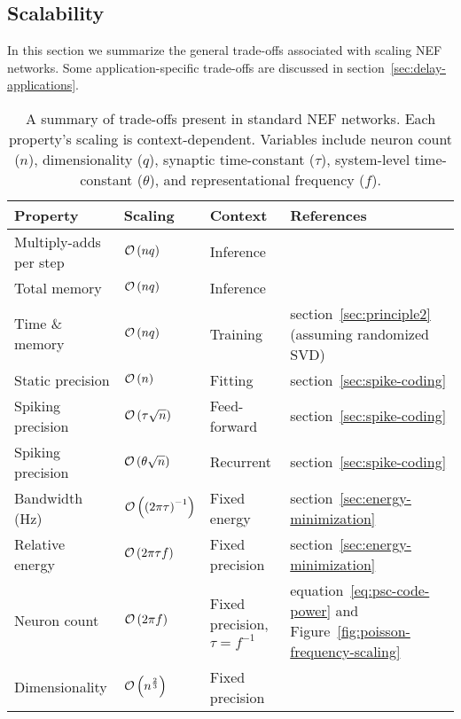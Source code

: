 \subsection{Scalability}
\label{sec:scalability}

In this section we summarize the general trade-offs associated with scaling NEF networks.
Some application-specific trade-offs are discussed in section~\ref{sec:delay-applications}.

\begin{sidewaystable}
\centering
  \begin{tabular}{@{}llll@{}} \toprule
    Property & Scaling & Context & References \\
    \midrule
    Multiply-adds per step & $\mathcal{O}\left({nq}\right)$ & Inference & \citet{voelker2018} \\
    Total memory & $\mathcal{O}\left({nq}\right)$ & Inference & \citet{mundy2015, voelker2018} \\
    Time \& memory & $\mathcal{O}\left({nq}\right)$ & Training & section~\ref{sec:principle2} (assuming randomized SVD) \\
    Static precision & $\mathcal{O}\left({n}\right)$ & Fitting & section~\ref{sec:spike-coding} \\
    Spiking precision & $\mathcal{O}\left({\tau \sqrt{n}}\right)$ & Feed-forward & section~\ref{sec:spike-coding} \\
    Spiking precision & $\mathcal{O}\left({\theta \sqrt{n}}\right)$ & Recurrent & section~\ref{sec:spike-coding} \\
    Bandwidth (Hz) & $\mathcal{O}\left({\left(2\pi \tau \right)^{-1}}\right)$ & Fixed energy & section~\ref{sec:energy-minimization} \\
    Relative energy & $\mathcal{O}\left({2\pi \tau f }\right)$ & Fixed precision & section~\ref{sec:energy-minimization} \\
    Neuron count & $\mathcal{O}\left({2 \pi f}\right)$ & Fixed precision, $\tau = f^{-1}$ & equation~\ref{eq:psc-code-power} and Figure~\ref{fig:poisson-frequency-scaling} \\
    Dimensionality & $\mathcal{O}\left({ n^{\frac{2}{3}} }\right)$ & Fixed precision & \citet[][p.~60]{gosmann2018} \\ %
    \bottomrule
  \end{tabular}
  \caption[Summary of scaling trade-offs in the NEF.]{ \label{tab:scalability}
    A summary of trade-offs present in standard NEF networks.
    Each property's scaling is context-dependent.
    Variables include neuron count ($n$), dimensionality ($q$), synaptic time-constant ($\tau$), system-level time-constant ($\theta$), and representational frequency ($f$).
  }
\end{sidewaystable}

